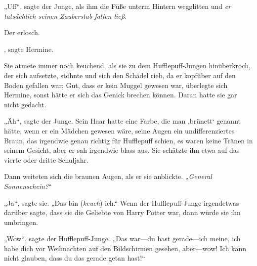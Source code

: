 „Uff“, sagte der Junge, als ihm die Füße unterm Hintern wegglitten und \emph{er tatsächlich seinen Zauberstab fallen ließ}.

Der  erlosch.

, sagte Hermine.

Sie atmete immer noch keuchend, als sie zu dem Hufflepuff-Jungen hinüberkroch, der sich aufsetzte, stöhnte und sich den Schädel rieb, da er kopfüber auf den Boden gefallen war; Gut, dass er kein Muggel gewesen war, überlegte sich Hermine, sonst hätte er sich das Genick brechen können. Daran hatte sie gar nicht gedacht.

„Äh“, sagte der Junge. Sein Haar hatte eine Farbe, die man ‚brünett‘ genannt hätte, wenn er ein Mädchen gewesen wäre, seine Augen ein undifferenziertes Braun, das irgendwie genau richtig für Hufflepuff schien, es waren keine Tränen in seinem Gesicht, aber er sah irgendwie blass aus. Sie schätzte ihn etwa auf das vierte oder dritte Schuljahr.

Dann weiteten sich die braunen Augen, als er sie anblickte. „\emph{General Sonnenschein?}“

„Ja“, sagte sie. „Das bin (\emph{keuch}) ich.“ Wenn der Hufflepuff-Junge irgendetwas darüber sagte, dass sie die Geliebte von Harry Potter war, dann würde sie ihn umbringen.

„Wow“, sagte der Hufflepuff-Junge. „Das war—du hast gerade—ich meine, ich habe dich vor Weihnachten auf den Bildschirmen gesehen, aber—wow! Ich kann nicht glauben, dass du das gerade getan hast!“

